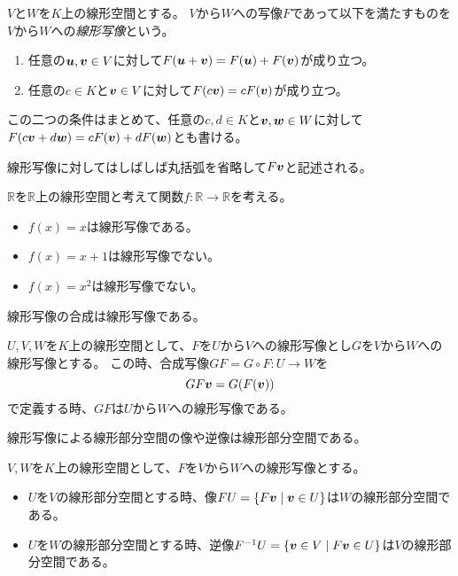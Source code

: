 \begin{definition}[線形写像]
$V$と$W$を$K$上の線形空間とする。
$V$から$W$への写像$F$であって以下を満たすものを$V$から$W$への\emph{線形写像}という。
\begin{enumerate}
\item
任意の$\vb*{u}, \vb*{v} \in V$に対して$F(\vb*{u}+\vb*{v}) = F(\vb*{u})+F(\vb*{v})$が成り立つ。
\item
任意の$c \in K$と$\vb*{v} \in V$に対して$F(c\vb*{v}) = c F(\vb*{v})$が成り立つ。
\end{enumerate}
この二つの条件はまとめて、任意の$c, d \in K$と$\vb*{v}, \vb*{w} \in W$に対して$F(c\vb*{v}+d\vb*{w}) = c F(\vb*{v})+d F(\vb*{w})$とも書ける。
\end{definition}

線形写像に対してはしばしば丸括弧を省略して$F\vb*{v}$と記述される。

\begin{example}
$\mathbb{R}$を$\mathbb{R}$上の線形空間と考えて関数$f: \mathbb{R} \to \mathbb{R}$を考える。
\begin{itemize}
\item
$f(x) = x$は線形写像である。
\item
$f(x) = x+1$は線形写像でない。
\item
$f(x) = x^2$は線形写像でない。
\end{itemize}
\end{example}

線形写像の合成は線形写像である。

\begin{proposition}[合成線形写像]
$U, V, W$を$K$上の線形空間として、$F$を$U$から$V$への線形写像とし$G$を$V$から$W$への線形写像とする。
この時、合成写像$G F = G\circ F: U \to W$を
$$
G F\vb*{v} = G(F(\vb*{v}))
$$
で定義する時、$G F$は$U$から$W$への線形写像である。
\end{proposition}

線形写像による線形部分空間の像や逆像は線形部分空間である。

\begin{proposition}[像と逆像]
$V, W$を$K$上の線形空間として、$F$を$V$から$W$への線形写像とする。
\begin{itemize}
\item
$U$を$V$の線形部分空間とする時、像$F U = \{ F\vb*{v} \mid \vb*{v} \in U \}$は$W$の線形部分空間である。
\item
$U$を$W$の線形部分空間とする時、逆像$F^{-1} U = \{ \vb*{v} \in V \mid F\vb*{v} \in U \}$は$V$の線形部分空間である。
\end{itemize}
\end{proposition}

